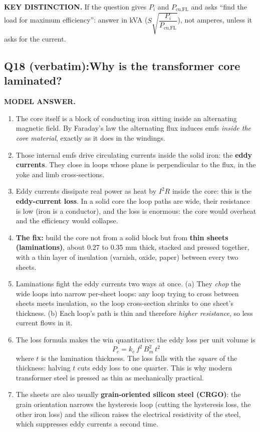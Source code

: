 \documentclass[11pt]{article}
\newcommand{\qhead}[2]{\subsection*{\color{copper}#1\quad\color{iron}#2}}
\newcommand{\tagline}[1]{\textbf{\color{copper}#1}}
\newcommand{\keydist}[1]{\vspace{2pt}\textbf{\color{red}KEY DISTINCTION.} #1}
\begin{document}
\keydist{If the question gives $P_i$ and $P_{\text{cu,FL}}$ and asks ``find the load for maximum efficiency'': answer in kVA ($S\sqrt{\dfrac{P_i}{P_{\text{cu,FL}}}}$), not amperes, unless it asks for the current.}

\qhead{Q18 (verbatim):}{Why is the transformer core laminated?}

\tagline{MODEL ANSWER.}
\begin{enumerate}[label=\arabic*.]
\item The core itself is a block of conducting iron sitting inside an alternating magnetic field. By Faraday's law the alternating flux induces emfs \emph{inside the core material}, exactly as it does in the windings.
\item Those internal emfs drive circulating currents inside the solid iron: the \textbf{eddy currents}. They close in loops whose plane is perpendicular to the flux, in the yoke and limb cross-sections.
\item Eddy currents dissipate real power as heat by $I^{2}R$ inside the core: this is the \textbf{eddy-current loss}. In a solid core the loop paths are wide, their resistance is low (iron is a conductor), and the loss is enormous: the core would overheat and the efficiency would collapse.
\item \textbf{The fix:} build the core not from a solid block but from \textbf{thin sheets (laminations)}, about 0.27 to 0.35 mm thick, stacked and pressed together, with a thin layer of insulation (varnish, oxide, paper) between every two sheets.
\item Laminations fight the eddy currents two ways at once. (a) They \emph{chop} the wide loops into narrow per-sheet loops: any loop trying to cross between sheets meets insulation, so the loop cross-section shrinks to one sheet's thickness. (b) Each loop's path is thin and therefore \emph{higher resistance}, so less current flows in it.
\item The loss formula makes the win quantitative: the eddy loss per unit volume is
\[
P_e = k_e\, f^{2}\, B_m^{2}\, t^{2}
\]
where $t$ is the lamination thickness. The loss falls with the \emph{square} of the thickness: halving $t$ cuts eddy loss to one quarter. This is why modern transformer steel is pressed as thin as mechanically practical.
\item The sheets are also usually \textbf{grain-oriented silicon steel (CRGO)}: the grain orientation narrows the hysteresis loop (cutting the hysteresis loss, the other iron loss) and the silicon raises the electrical resistivity of the steel, which suppresses eddy currents a second time.

\end{enumerate}
\end{document}
